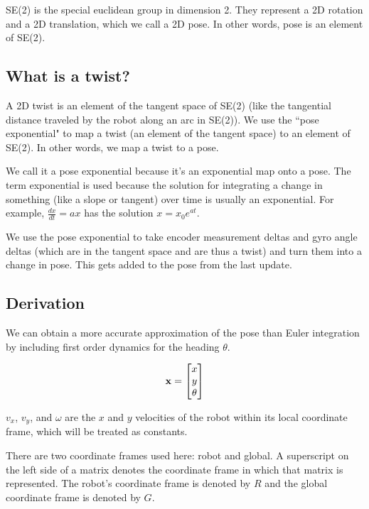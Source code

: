 SE(2) is the special euclidean group in dimension 2. They represent a 2D
rotation and a 2D translation, which we call a 2D pose. In other words, pose is
an element of SE(2).

\subsection{What is a twist?}

A 2D twist is an element of the tangent space of SE(2) (like the tangential
distance traveled by the robot along an arc in SE(2)). We use the ``pose
exponential" to map a twist (an element of the tangent space) to an element of
SE(2). In other words, we map a twist to a pose.

We call it a pose exponential because it’s an exponential map onto a pose. The
term exponential is used because the solution for integrating a change in
something (like a slope or tangent) over time is usually an exponential. For
example, $\frac{dx}{dt} = ax$ has the solution $x = x_0 e^{at}$.

We use the pose exponential to take encoder measurement deltas and gyro angle
deltas (which are in the tangent space and are thus a twist) and turn them into
a change in pose. This gets added to the pose from the last update.

\subsection{Derivation}

We can obtain a more accurate approximation of the pose than Euler integration
by including first order dynamics for the heading $\theta$.

\begin{equation*}
  \mathbf{x} = \begin{bmatrix}
    x \\
    y \\
    \theta
  \end{bmatrix}
\end{equation*}

$v_x$, $v_y$, and $\omega$ are the $x$ and $y$ velocities of the robot within
its local coordinate frame, which will be treated as constants.

\begin{remark}
  There are two coordinate frames used here: robot and global. A superscript on
  the left side of a matrix denotes the coordinate frame in which that matrix is
  represented. The robot's coordinate frame is denoted by $R$ and the global
  coordinate frame is denoted by $G$.
\end{remark}

